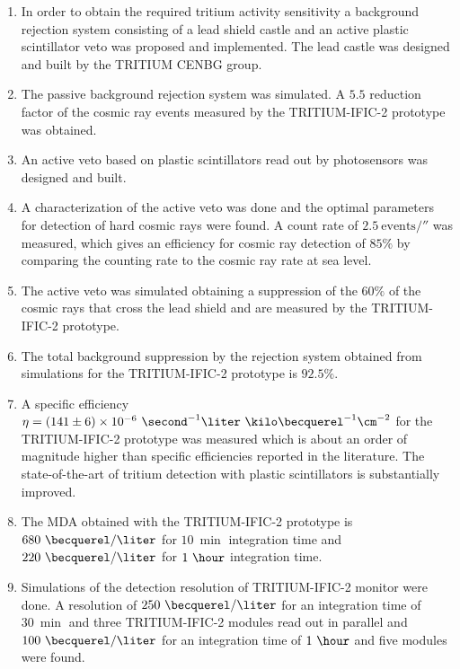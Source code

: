 \begin{enumerate}
\item{} In order to obtain the required tritium activity sensitivity a background rejection system consisting of a lead shield castle and an active plastic scintillator veto was proposed and implemented. The lead castle was designed and built by the TRITIUM CENBG group.

\item{} The passive background rejection system was simulated. A $5.5$ reduction factor of the cosmic ray events measured by the TRITIUM-IFIC-2 prototype was obtained.

\item{} An active veto based on plastic scintillators read out by photosensors was designed and built.

\item{} A characterization of the active veto was done and the optimal parameters for detection of hard cosmic rays were found. A count rate of $2.5~\text{events}/\second$ was measured, which gives an efficiency for cosmic ray detection of $85\%$ by comparing the counting rate to the cosmic ray rate at sea level.

\item{} The active veto was simulated obtaining a suppression of the $60\%$ of the cosmic rays that cross the lead shield and are measured by the TRITIUM-IFIC-2 prototype.

\item{} The total background suppression by the rejection system obtained from simulations for the TRITIUM-IFIC-2 prototype is $92.5\%$.

\item{} A specific efficiency $\eta = (141 \pm 6) \times 10^{-6}~ \second^{-1}  \liter ~ \kilo\becquerel^{-1} \cm^{-2}$ for the TRITIUM-IFIC-2  prototype was measured which is about an order of magnitude higher than specific efficiencies reported in the literature. The state-of-the-art of tritium detection with plastic scintillators is substantially improved.

\item{} The MDA obtained with the TRITIUM-IFIC-2 prototype is $680~\becquerel/\liter$  for $10~\min$ integration time and $220~\becquerel/\liter$  for $1~\hour$ integration time.

\item{} Simulations of the detection resolution of TRITIUM-IFIC-2 monitor were done. A resolution of $250~\becquerel/\liter$ for an integration time of $30~\min$ and three TRITIUM-IFIC-2 modules read out in parallel and $100~\becquerel/\liter$ for an integration time of $1~\hour$ and five modules were found.


\end{enumerate}
